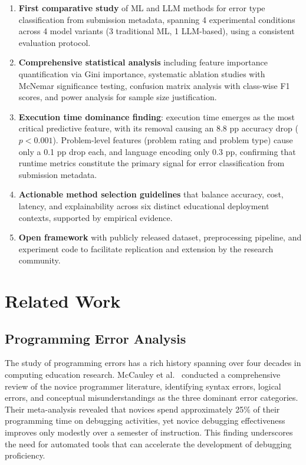 \documentclass[10pt,a4paper]{article}
\begin{document}
\begin{enumerate}
    \item \textbf{First comparative study} of ML and LLM methods for error
          type classification from submission metadata, spanning 4
          experimental conditions across 4 model variants (3 traditional ML,
          1 LLM-based), using a consistent evaluation protocol.
    \item \textbf{Comprehensive statistical analysis} including feature
          importance quantification via Gini importance, systematic ablation
          studies with McNemar significance testing, confusion matrix analysis
          with class-wise F1 scores, and power analysis for sample size
          justification.
    \item \textbf{Execution time dominance finding}: execution time emerges as
          the most critical predictive feature, with its removal causing an 8.8 pp
          accuracy drop ($p < 0.001$). Problem-level features (problem rating and
          problem type) cause only a 0.1 pp drop each, and language encoding only
          0.3 pp, confirming that runtime metrics constitute the primary signal
          for error classification from submission metadata.
    \item \textbf{Actionable method selection guidelines} that balance
          accuracy, cost, latency, and explainability across six distinct
          educational deployment contexts, supported by empirical evidence.
    \item \textbf{Open framework} with publicly released dataset, preprocessing
          pipeline, and experiment code to facilitate replication and
          extension by the research community.
\end{enumerate}

\section{Related Work}

\subsection{Programming Error Analysis}

The study of programming errors has a rich history spanning over four decades
in computing education research. McCauley et
al.~\cite{mccauley2008evidence}
conducted a comprehensive review of the novice programmer literature, identifying
syntax errors, logical errors, and conceptual misunderstandings as the three
dominant error categories. Their meta-analysis revealed that novices spend
approximately 25\% of their programming time on debugging activities, yet
novice debugging effectiveness improves only modestly over a semester of
instruction. This finding underscores the need for automated tools that can
accelerate the development of debugging proficiency.
\end{document}
